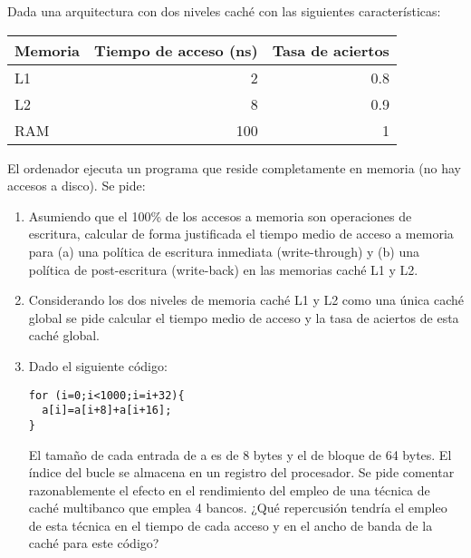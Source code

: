 \begin{acexercise}\end{acexercise}

Dada una arquitectura con dos niveles caché con las siguientes características:

\begin{tabular}{|l|r|r|}
\hline
Memoria &
Tiempo de acceso (ns) &
Tasa de aciertos
\\
\hline
\hline

L1 &
2 &
0.8
\\
\hline

L2 &
8 &
0.9
\\
\hline

RAM &
100 &
1
\\
\hline

\end{tabular}

El ordenador ejecuta un programa que reside completamente en memoria (no hay
accesos a disco). Se pide:

\begin{enumerate}

  \item Asumiendo que el 100\% de los accesos a memoria son operaciones de
escritura, calcular de forma justificada el tiempo medio de acceso a memoria
para (a) una política de escritura inmediata (write-through) y (b) una política
de post-escritura (write-back) en las memorias caché L1 y L2.

  \item Considerando los dos niveles de memoria caché L1 y L2 como una única
caché global se pide calcular el tiempo medio de acceso y la tasa de aciertos
de esta caché global.

  \item Dado el siguiente código:
\begin{lstlisting}
for (i=0;i<1000;i=i+32){
  a[i]=a[i+8]+a[i+16];
}
\end{lstlisting}

El tamaño de cada entrada de a es de 8 bytes y el de bloque de 64 bytes. El
índice del bucle se almacena en un registro del procesador.  Se pide comentar
razonablemente el efecto en el rendimiento del empleo de una técnica de caché
multibanco que emplea 4 bancos. ¿Qué repercusión tendría el empleo de esta
técnica en el tiempo de cada acceso y en el ancho de banda de la caché para
este código?

\end{enumerate}

\begin{acsolution}\end{acsolution}

